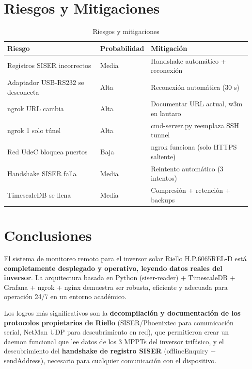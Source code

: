 \documentclass[12pt,a4paper]{article}
\begin{document}
\section{Riesgos y Mitigaciones}

\begin{table}[H]
\centering
\begin{tabular}{lll}
\toprule
\textbf{Riesgo} & \textbf{Probabilidad} & \textbf{Mitigaci\'on} \\
\midrule
Registros SISER incorrectos & Media & Handshake autom\'atico + reconexi\'on \\
Adaptador USB-RS232 se desconecta & Alta & Reconexi\'on autom\'atica (30 s) \\
ngrok URL cambia & Alta & Documentar URL actual, w3m en lautaro \\
ngrok 1 solo t\'unel & Alta & cmd-server.py reemplaza SSH tunnel \\
Red UdeC bloquea puertos & Baja & ngrok funciona (solo HTTPS saliente) \\
Handshake SISER falla & Media & Reintento autom\'atico (3 intentos) \\
TimescaleDB se llena & Media & Compresi\'on + retenci\'on + backups \\
\bottomrule
\end{tabular}
\caption{Riesgos y mitigaciones}
\end{table}

\section{Conclusiones}

El sistema de monitoreo remoto para el inversor solar Riello H.P.6065REL-D est\'a \textbf{completamente desplegado y operativo, leyendo datos reales del inversor}. La arquitectura basada en Python (siser-reader) + TimescaleDB + Grafana + ngrok + nginx demuestra ser robusta, eficiente y adecuada para operaci\'on 24/7 en un entorno acad\'emico.

Los logros m\'as significativos son la \textbf{decompilaci\'on y documentaci\'on de los protocolos propietarios de Riello} (SISER/Phoenixtec para comunicaci\'on serial, NetMan UDP para descubrimiento en red), que permitieron crear un daemon funcional que lee datos de los 3 MPPTs del inversor trif\'asico, y el descubrimiento del \textbf{handshake de registro SISER} (offlineEnquiry + sendAddress), necesario para cualquier comunicaci\'on con el dispositivo.
\end{document}
